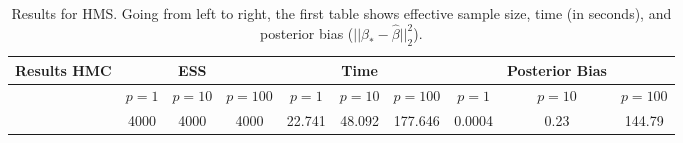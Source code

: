 \documentclass{article}
\begin{document}
\begin{table}[!ht]
    \centering
    \caption{Results for HMS. Going from left to right, the first table shows effective sample size, time (in seconds), and posterior bias ($||\beta_* - \hat{\beta}||_2^2$).}
    \label{table-results-HMC}
    \footnotesize
    \begin{tabular}{| c | c c c || c c c || c c c |} \toprule
    Results HMC                    & & ESS &  &  & Time &  & & Posterior Bias &  \\ \midrule
       & $p=1$ & $p = 10$ & $p = 100$ & $p=1$ & $p = 10$ & $p = 100$ & $p=1$ & $p = 10$ & $p = 100$ \\ \midrule 
       &  4000     &   4000      &    4000      &    22.741  &   48.092    &  177.646    &  0.0004   &  0.23   & 144.79 \\\bottomrule
    \end{tabular}
\end{table}
\end{document}

